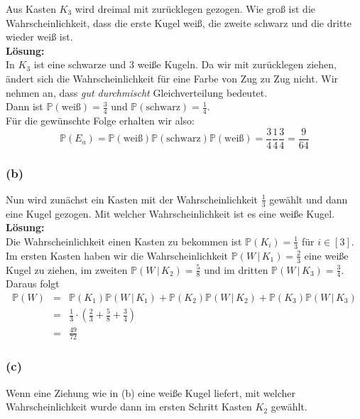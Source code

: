 \documentclass[11pt,a4paper,ngerman]{article}
\newcommand{\Prob}{\mathbb{P}}
\begin{document}
Aus Kasten $K_3$ wird dreimal mit zurücklegen gezogen. Wie groß ist die Wahrscheinlichkeit, dass die erste Kugel
weiß, die zweite schwarz und die dritte wieder weiß ist.\\

\textbf{Lösung:}\\
In $K_3$ ist eine schwarze und 3 weiße Kugeln. Da wir mit zurücklegen ziehen, ändert sich die 
Wahrscheinlichkeit für eine Farbe von Zug zu Zug nicht. Wir nehmen an, dass \emph{gut durchmischt} Gleichverteilung bedeutet.\\

Dann ist $\Prob(\text{weiß}) = \frac{3}{4}$ und $\Prob(\text{schwarz}) = \frac{1}{4}$.\\
Für die gewünschte Folge erhalten wir also:
\[
    \Prob(E_a) = \Prob(\text{weiß})\Prob(\text{schwarz})\Prob(\text{weiß}) = \frac{3}{4} \frac{1}{4} \frac{3}{4} = \frac{9}{64}
\]

\subsubsection*{(b)}

Nun wird zunächst ein Kasten mit der Wahrscheinlichkeit $\frac{1}{3}$ gewählt und dann eine Kugel gezogen. Mit welcher Wahrscheinlichkeit
ist es eine weiße Kugel.\\

\textbf{Lösung:}\\

Die Wahrscheinlichkeit einen Kasten zu bekommen ist $\Prob(K_i) = \frac{1}{3}$ für $i \in [3]$.
Im ersten Kasten haben wir die Wahrscheinlichkeit
$\Prob(W \,|\, K_1) = \frac{2}{3}$ eine weiße Kugel zu ziehen, im zweiten $\Prob(W \,|\, K_2) = \frac{5}{8}$ und im dritten $\Prob(W \,|\, K_3) = \frac{3}{4}$.
Daraus folgt
\[
    \begin{array}{rcl}
    \Prob(W) &=& \Prob(K_1)\Prob(W \, | \, K_1) + \Prob(K_2)\Prob(W \, | \, K_2) + \Prob(K_3)\Prob(W \, | \, K_3)\\
            &=& \frac{1}{3} \cdot \left( \frac{2}{3} + \frac{5}{8} + \frac{3}{4} \right)\\
            &=& \frac{49}{72}
    \end{array}
\]

\subsubsection*{(c)}

Wenn eine Ziehung wie in (b) eine weiße Kugel liefert, mit welcher Wahrscheinlichkeit wurde dann im ersten Schritt Kasten $K_2$ gewählt.\\
\end{document}
